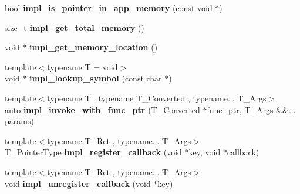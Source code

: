 \begin{DoxyCompactItemize}
bool {\bfseries impl\+\_\+is\+\_\+pointer\+\_\+in\+\_\+app\+\_\+memory} (const void $\ast$)
\item 
\mbox{\label{classrlbox_1_1rlbox__noop__sandbox_a5b0f5a989ec5b17cfe32ed469231ea16}} 
size\+\_\+t {\bfseries impl\+\_\+get\+\_\+total\+\_\+memory} ()
\item 
\mbox{\label{classrlbox_1_1rlbox__noop__sandbox_ace3002edfb4b3758ab62d18f2388c491}} 
void $\ast$ {\bfseries impl\+\_\+get\+\_\+memory\+\_\+location} ()
\item 
\mbox{\label{classrlbox_1_1rlbox__noop__sandbox_acdf126ad5afb5dc94686bda3e9b1a36f}} 
{\footnotesize template$<$typename T  = void$>$ }\\void $\ast$ {\bfseries impl\+\_\+lookup\+\_\+symbol} (const char $\ast$)
\item 
\mbox{\label{classrlbox_1_1rlbox__noop__sandbox_a0833932a29d618a1ab9d047e4a215657}} 
{\footnotesize template$<$typename T , typename T\+\_\+\+Converted , typename... T\+\_\+\+Args$>$ }\\auto {\bfseries impl\+\_\+invoke\+\_\+with\+\_\+func\+\_\+ptr} (T\+\_\+\+Converted $\ast$func\+\_\+ptr, T\+\_\+\+Args \&\&... params)
\item 
\mbox{\label{classrlbox_1_1rlbox__noop__sandbox_ae787e181a8d293b115c0890e8036f03e}} 
{\footnotesize template$<$typename T\+\_\+\+Ret , typename... T\+\_\+\+Args$>$ }\\T\+\_\+\+Pointer\+Type {\bfseries impl\+\_\+register\+\_\+callback} (void $\ast$key, void $\ast$callback)
\item 
\mbox{\label{classrlbox_1_1rlbox__noop__sandbox_a2949f30bdc7cdc297042465818357ca0}} 
{\footnotesize template$<$typename T\+\_\+\+Ret , typename... T\+\_\+\+Args$>$ }\\void {\bfseries impl\+\_\+unregister\+\_\+callback} (void $\ast$key)
\end{DoxyCompactItemize}
